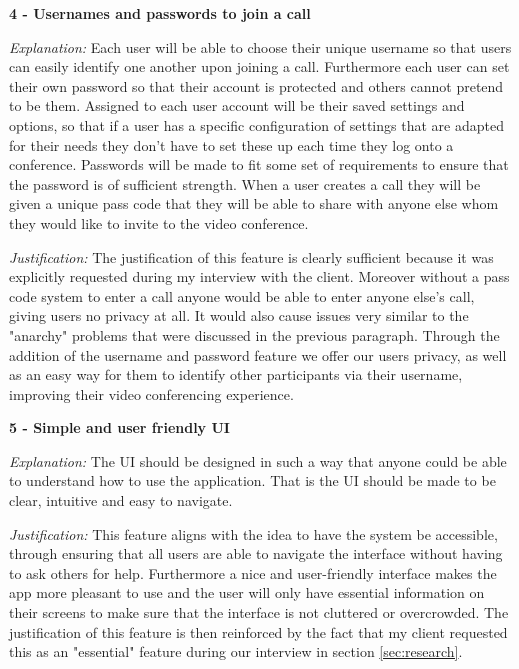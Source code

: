 \vspace{0.2cm}

\textsf{\bfseries 4 - Usernames and passwords to join a call} \\ 
\vspace{0.1cm}

\textit{Explanation:} Each user will be able to choose their unique username so 
that users can easily identify one another upon joining a 
call. Furthermore each user can set their own password so 
that their account is protected and others cannot pretend to 
be them. 
Assigned to each user account will be their saved settings and
options, so that if a user has a specific configuration of 
settings that are adapted for their needs they don't have to 
set these up each time they log onto a conference. Passwords 
will be made to fit some set of requirements to ensure that 
the password is of sufficient strength. When a user creates a 
call they will be given a unique pass code that they will be 
able to share with anyone else whom they would like to invite
to the video conference. \vspace{0.1cm}

\textit{Justification:} The justification of this feature is
clearly sufficient because it was explicitly requested during
my interview with the client. Moreover without a pass code 
system to enter a call anyone would be able to enter anyone
else's call, giving users no privacy at all. It would also 
cause issues very similar to the "anarchy" problems that 
were discussed in the previous paragraph. Through the
addition of the username and password feature we offer our 
users privacy, as well as an easy way for them to identify
other participants via their username, improving their
video conferencing experience.

\vspace{0.2cm}

\textsf{\bfseries 5 - Simple and user friendly UI} \\ \vspace{0.1cm}

\textit{Explanation:} 
The UI should be designed in such a way that anyone could be 
able to understand how to use the application. That is the UI
should be made to be clear, intuitive and easy to navigate.
\vspace{0.1cm}

\textit{Justification:} 
This feature
aligns with the idea to have the system be accessible,
through ensuring that all users are able to navigate the 
interface without having to ask others for help. Furthermore
a nice and user-friendly interface makes the app more 
pleasant to use and the user will only have essential 
information on their screens
to make sure that the interface is not cluttered or 
overcrowded. The justification of this feature is then 
reinforced by the fact that my client requested this as an 
"essential" feature during our interview
in section \ref{sec:research}. \vspace{0.2cm}

